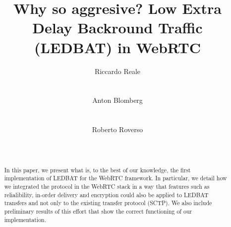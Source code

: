 \documentclass{sig-alternate}
\begin{document}


\title{Why so aggresive? Low Extra Delay Backround Traffic (LEDBAT) in WebRTC}


\author{
\alignauthor
Riccardo Reale\\
      \\
      \\
\alignauthor
Anton Blomberg\\
      \\
      \\
\alignauthor
Roberto Roverso\\
      \\
      \\
}

\newcommand{\mysec}[1]{\vspace*{-0.0cm}\section{#1}}
\newcommand{\mysubsec}[1]{\vspace*{-0.0cm}\subsection{#1}\vspace*{0cm}}
\newcommand{\mysubsubsec}[1]{\vspace*{-0.0cm}\subsubsection{#1}\vspace*{0cm}}
\newcommand{\mypar}[1]{\vspace*{-0cm}\paragraph{#1}\vspace*{0cm}}

\maketitle

\begin{abstract}

In this paper, we present what is, to the best of our knowledge, the first implementation
of LEDBAT for the WebRTC framework. In particular, we detail how we integrated the
protocol in the WebRTC stack in a way that features such as relialibility, in-order
delivery and encryption could also be applied to LEDBAT transfers and not only to
the existing transfer protocol (SCTP). We also include preliminary results of this effort
that show the correct functioning of our implementation.
\end{abstract}
\end{document}
